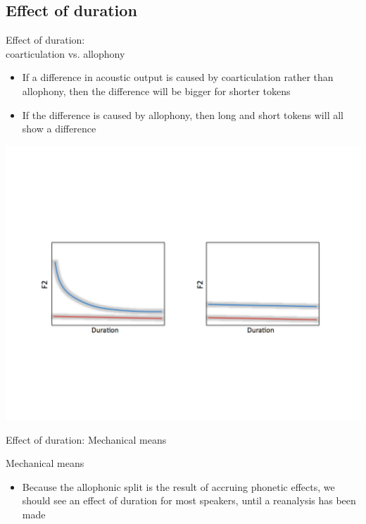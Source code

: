 \documentclass[hyperref={pdfpagelabels=false}]{beamer}
\begin{document}
\subsection{Effect of duration}
\begin{frame}{Effect of duration: \\ coarticulation vs. allophony}
	\begin{itemize} 
		\item If a difference in acoustic output is caused by coarticulation rather than allophony, then the difference will be bigger for shorter tokens
		\item If the difference is caused by allophony, then long and short tokens will all show a difference
	\end{itemize}
	\begin{center}

	\includegraphics[trim=2cm 2cm 2cm 6cm, clip=true, width=1\textwidth]{DurationEx.pdf}

\end{center}\end{frame}

\begin{frame}{Effect of duration: Mechanical means}
	\begin{block}{Mechanical means}
		\begin{itemize}
			\item Because the allophonic split is the result of accruing phonetic effects, we should see an effect of duration for most speakers, until a reanalysis has been made
		\end{itemize}
	\end{block}	
\end{frame}
\end{document}
